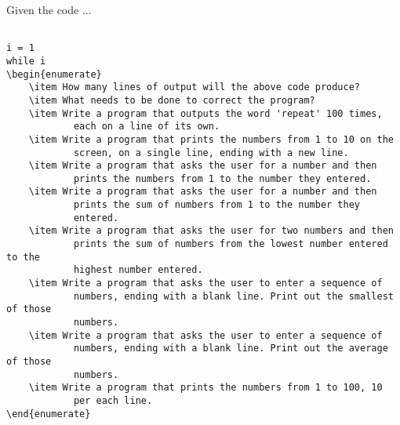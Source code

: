 Given the code ...
\begin{lstlisting}

i = 1
while i 
\begin{enumerate}
	\item How many lines of output will the above code produce?
	\item What needs to be done to correct the program?
	\item Write a program that outputs the word 'repeat' 100 times,
			each on a line of its own.
	\item Write a program that prints the numbers from 1 to 10 on the
			screen, on a single line, ending with a new line.
	\item Write a program that asks the user for a number and then
			prints the numbers from 1 to the number they entered.
	\item Write a program that asks the user for a number and then
			prints the sum of numbers from 1 to the number they
			entered.
	\item Write a program that asks the user for two numbers and then
			prints the sum of numbers from the lowest number entered to the
			highest number entered.
	\item Write a program that asks the user to enter a sequence of
			numbers, ending with a blank line. Print out the smallest of those
			numbers.
	\item Write a program that asks the user to enter a sequence of
			numbers, ending with a blank line. Print out the average of those
			numbers.
	\item Write a program that prints the numbers from 1 to 100, 10
			per each line.
\end{enumerate}\end{lstlisting} 
